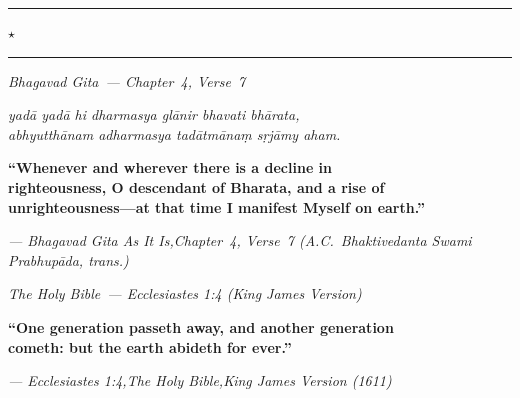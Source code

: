 \documentclass[12pt, letterpaper]{article}
\theoremstyle{definition}
\begin{document}
\newpage
\thispagestyle{empty}
\vspace*{3.5cm}

\begin{center}
\rule{0.45\linewidth}{0.4pt}\quad
{\large\textcolor{cgngold}{$\star$}}
\quad\rule{0.45\linewidth}{0.4pt}
\end{center}

\vspace{1.2cm}

\begin{center}
{\large\textit{\textcolor{cgndark}{Bhagavad Gita~--- Chapter~4, Verse~7}}}
\end{center}
\vspace{0.4cm}
\begin{center}
{\small\textit{yad\={a} yad\={a} hi dharmasya gl\={a}nir bhavati bh\={a}rata,\\
abhyutth\={a}nam adharmasya tad\={a}tm\={a}na\d{m} s\d{r}j\={a}my aham.}}
\end{center}
\vspace{0.5cm}
\begin{center}
\begin{minipage}{0.82\textwidth}
\centering
\textbf{\textcolor{cgnred}{``Whenever and wherever there is a decline in\\
righteousness, O descendant of Bharata, and a rise of\\
unrighteousness---at that time I manifest Myself on earth.''}}
\end{minipage}
\end{center}
\vspace{0.3cm}
\begin{center}
{\small\textcolor{cgndark}{\textit{--- Bhagavad Gita As It Is,\enspace Chapter~4, Verse~7%
\enspace (A.C.\ Bhaktivedanta Swami Prabhup\={a}da, trans.)}}}
\end{center}

\vspace{1.8cm}

\begin{center}
{\large\textit{\textcolor{cgndark}{The Holy Bible~--- Ecclesiastes 1:4 (King James Version)}}}
\end{center}
\vspace{0.5cm}
\begin{center}
\begin{minipage}{0.82\textwidth}
\centering
\textbf{\textcolor{cgnred}{``One generation passeth away, and another generation\\
cometh: but the earth abideth for ever.''}}
\end{minipage}
\end{center}
\vspace{0.3cm}
\begin{center}
{\small\textcolor{cgndark}{\textit{--- Ecclesiastes 1:4,\enspace The Holy Bible,\enspace King James Version (1611)}}}
\end{center}
\end{document}
